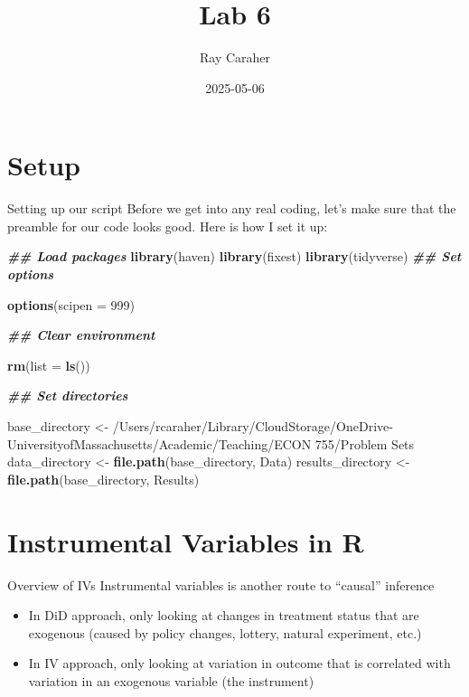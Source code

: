 \documentclass[
  ignorenonframetext,
]{beamer}
\title{Lab 6}
\author{Ray Caraher}
\date{2025-05-06}
\newenvironment{Shaded}{\begin{snugshade}}{\end{snugshade}}
\newcommand{\AttributeTok}[1]{\textcolor[rgb]{0.13,0.29,0.53}{#1}}
\newcommand{\DecValTok}[1]{\textcolor[rgb]{0.00,0.00,0.81}{#1}}
\newcommand{\DocumentationTok}[1]{\textcolor[rgb]{0.56,0.35,0.01}{\textbf{\textit{#1}}}}
\newcommand{\FunctionTok}[1]{\textcolor[rgb]{0.13,0.29,0.53}{\textbf{#1}}}
\newcommand{\NormalTok}[1]{#1}
\newcommand{\OtherTok}[1]{\textcolor[rgb]{0.56,0.35,0.01}{#1}}
\newcommand{\StringTok}[1]{\textcolor[rgb]{0.31,0.60,0.02}{#1}}
\providecommand{\tightlist}{%
  \setlength{\itemsep}{0pt}\setlength{\parskip}{0pt}}
\begin{document}
\frame{\titlepage}

\section{Setup}\label{setup}

\begin{frame}[fragile]{Setting up our script}
\label{setting-up-our-script}
Before we get into any real coding, let's make sure that the preamble
for our code looks good. Here is how I set it up:

\tiny

\begin{Shaded}
\begin{Highlighting}[]
\DocumentationTok{\#\# Load packages}
\FunctionTok{library}\NormalTok{(haven)}
\FunctionTok{library}\NormalTok{(fixest)}
\FunctionTok{library}\NormalTok{(tidyverse)}
\DocumentationTok{\#\# Set options}

\FunctionTok{options}\NormalTok{(}\AttributeTok{scipen =} \DecValTok{999}\NormalTok{)}

\DocumentationTok{\#\# Clear environment}

\FunctionTok{rm}\NormalTok{(}\AttributeTok{list =} \FunctionTok{ls}\NormalTok{())}

\DocumentationTok{\#\# Set directories}

\NormalTok{base\_directory }\OtherTok{\textless{}{-}} \StringTok{\textquotesingle{}/Users/rcaraher/Library/CloudStorage/OneDrive{-}UniversityofMassachusetts/Academic/Teaching/ECON 755/Problem Sets\textquotesingle{}}
\NormalTok{data\_directory }\OtherTok{\textless{}{-}} \FunctionTok{file.path}\NormalTok{(base\_directory, }\StringTok{\textquotesingle{}Data\textquotesingle{}}\NormalTok{)}
\NormalTok{results\_directory }\OtherTok{\textless{}{-}} \FunctionTok{file.path}\NormalTok{(base\_directory, }\StringTok{\textquotesingle{}Results\textquotesingle{}}\NormalTok{)}
\end{Highlighting}
\end{Shaded}
\end{frame}

\section{Instrumental Variables in R}\label{instrumental-variables-in-r}

\begin{frame}{Overview of IVs}
\label{overview-of-ivs}
Instrumental variables is another route to ``causal'' inference

\begin{itemize}
\tightlist
\item
  In DiD approach, only looking at changes in treatment status that are
  exogenous (caused by policy changes, lottery, natural experiment,
  etc.)
\item
  In IV approach, only looking at variation in outcome that is
  correlated with variation in an exogenous variable (the instrument)
\end{itemize}
\end{frame}
\end{document}

